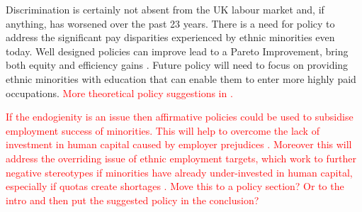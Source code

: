 \documentclass[class=article, crop=false]{standalone}
\begin{document}
Discrimination is certainly not absent from the UK labour market and, if anything, has worsened over the past 23 years. There is a need for policy to address the significant pay disparities experienced by ethnic minorities even today. Well designed policies can improve lead to a Pareto Improvement, bring both equity and efficiency gains \citep{LundbergB}. Future policy will need to focus on providing ethnic minorities with education that can enable them to enter more highly paid occupations. \textcolor{red}{More theoretical policy suggestions in \citep{LundbergB}.} 

\textcolor{red}{
If the endogienity is an issue then affirmative policies could be used to subsidise employment success of minorities. This will help to overcome the lack of investment in human capital caused by employer prejudices \citep{Coate}. Moreover this will address the overriding issue of ethnic employment targets, which work to further negative stereotypes if minorities have already under-invested in human capital, especially if quotas create shortages \citep{Welch}. Move this to a policy section? Or to the intro and then put the suggested policy in the conclusion?
}
\ifstandalone

\fi
\end{document}
